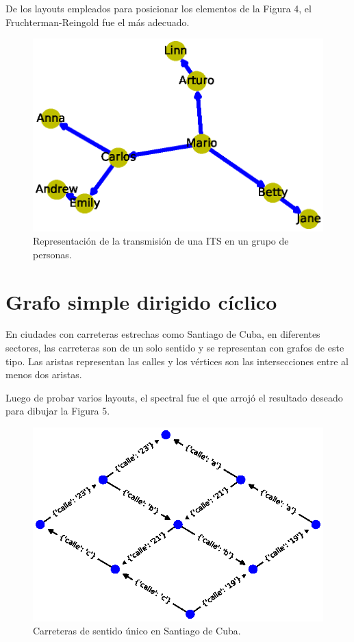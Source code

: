 \documentclass{article}
\begin{document}
De los layouts empleados para posicionar los elementos de la Figura 4, el Fruchterman-Reingold fue el más adecuado.

\begin{figure}
  \includegraphics[width=.8\columnwidth]{fig4.eps}
  \caption{Representación de la transmisión de una ITS en un grupo de personas.}
  \label{Figura 4}
\end{figure}




\section{Grafo simple dirigido cíclico}

En ciudades con carreteras estrechas como Santiago de Cuba, en diferentes sectores, las carreteras son de un solo sentido y se representan con grafos de este tipo. Las aristas representan las calles y los vértices son las intersecciones entre al menos dos aristas.

Luego de probar varios layouts, el spectral fue el que arrojó el resultado deseado para dibujar la Figura 5.

\begin{figure}
  \includegraphics[width=.8\columnwidth]{fig5.eps}
  \caption{Carreteras de sentido único en Santiago de Cuba.}
  \label{Figura 5}
\end{figure}
\end{document}
